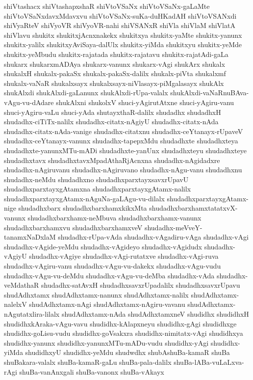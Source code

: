 {shiVtashacx
shiVtashapxshaR
shiVtoVSaNx
shiVtoVSaNx-gaLaMte
shiVtoVSaNxdavxMdavxvu
shiVtoVSaNx-suKa-duHKadAH
shiVtoVSANxdi
shiVyaRteV
shiVyoVR
shiVyoVR-nahi
shiVSANxR
shiVla
shiVlaM
shiVlatA
shiVlavu
shukitx
shukitxjAcnxnakekx
shukitxya
shukitx-yaMte
shukitx-yanunx
shukitx-yalilx
shukitxyAviSaya-dalUlx
shukitx-yiMda
shukitxyu
shukitx-yeMde
shukitx-yeMbudu
shukitx-rajatada
shukitx-rajatavu
shukitx-rajatAdi-gaLa
shukarx
shukarxmADAya
shukarx-vanunx
shukarx-vAgi
shukArx
shukalx
shukalxH
shukalx-pakaSx
shukalx-pakaSx-dalilx
shukalx-piVta
shukalxmf
shukalx-vaNaR
shukalxsayx
shukalxsayx-niVlasayx-piMgalasayx
shukAlx
shukAlxdi
shukAlxdi-gaLanunx
shukAlxdi-rUpa-valalx
shukAlxdi-vaNaRnuBAva-vAgu-vu-dAdare
shukAlxni
shukolxV
shuci-yAgirutAtxne
shuci-yAgiru-vanu
shuci-yAgiru-vaLu
shuci-yAda
shutayxthaR-dalilx
shudadhx
shudadhxH
shudadhx-ciTiTx-nalilx
shudadhx-citatx-nAgiyU
shudadhx-citatx-nAda
shudadhx-citatx-nAda-vanige
shudadhx-citatxnu
shudadhx-ceYtanayx-rUpaveV
shudadhx-ceYtanayx-vanunx
shudadhx-tapepxMdu
shudadhxte
shudadhxteya
shudadhxte-yanunxMTu-mADi
shudadhxte-yanUnx
shudadhxteyu
shudadhxteye
shudadhxtavx
shudadhxtavxMpadAthaRjAcnxna
shudadhx-nAgidadxre
shudadhx-nAgiruvanu
shudadhx-nAgiruvano
shudadhx-nAgu-vanu
shudadhxnu
shudadhx-neMdu
shudadhxno
shudadhxparxtayxsavxrUpavU
shudadhxparxtayxgAtamxna
shudadhxparxtayxgAtamx-nalilx
shudadhxparxtayxgAtamx-nAguNa-gaLAgu-vu-dilalx
shudadhxparxtayxgAtamx-nige
shudadhxbarx
shudadhxbarxhamxkikxMta
shudadhxbarxhamxtatatxvX-vanunx
shudadhxbarxhamx-neMbuva
shudadhxbarxhamx-vanunx
shudadhxbarxhamxvu
shudadhxbarxhamxveV
shudadhx-meVveY-tanamxNaDxlaM
shudadhx-rUpa-vAda
shudadhx-vAgadiru-vAga
shudadhx-vAgi
shudadhx-vAgide-yeMdu
shudadhx-vAgideyo
shudadhx-vAgidudx
shudadhx-vAgiyU
shudadhx-vAgiye
shudadhx-vAgi-rutatxve
shudadhx-vAgi-ruva
shudadhx-vAgiru-vanu
shudadhx-vAgu-vu-dakekx
shudadhx-vAgu-vudu
shudadhx-vAgu-vu-deMdu
shudadhx-vAgu-vu-deMba
shudadhx-vAda
shudadhx-veMdathaR
shudadhx-satAvxH
shudadhxsavxrUpadalilx
shudadhxsavxrUpavu
shudAdhxtamx
shudAdhxtamx-nanunx
shudAdhxtamx-nalilx
shudAdhxtamx-nalelxV
shudAdhxtamx-nAgi
shudAdhxtamx-nAgiru-vavanu
shudAdhxtamx-nAgutatxlira-lilalx
shudAdhxtamx-nAda
shudAdhxtamxneV
shudidhx
shudidhxH
shudidhxkAraka-vAgu-vavu
shudidhx-kAlapxneyu
shudidhx-gAgi
shudidhxge
shudidhx-goLisu-vudu
shudidhx-goVsakxra
shudidhx-nimitatx-vAgi
shudidhxya
shudidhx-yanunx
shudidhx-yanunxMTu-mADu-vudu
shudidhx-yAgi
shudidhx-yiMda
shudidhxyU
shudidhx-yeMdu
shudwdhx
shubAshuBa-kamaR
shuBa
shuBakara-valalx
shuBa-kamaR-gaLu
shuBa-pala-dalilx
shuBa-lABa-vuLaLxva-rAgi
shuBa-vanAnxgali
shuBa-vanonx
shuBa-vAkayx
}
